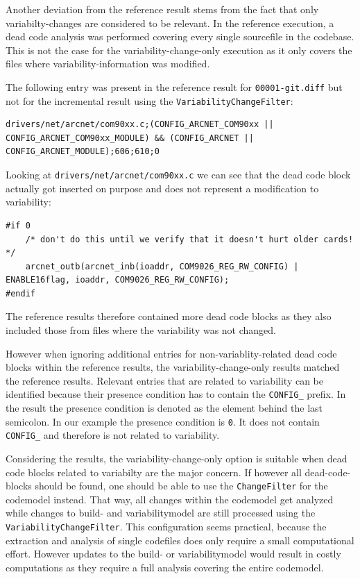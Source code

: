 \documentclass[a4paper]{article}
\begin{document}
Another deviation from the reference result stems from the fact that only variabilty-changes are considered to be relevant. In the reference execution, a dead code analysis was performed covering every single sourcefile in the codebase. This is not the case for the variability-change-only execution as it only covers the files where variability-information was modified.

The following entry was present in the reference result for \texttt{00001-git.diff} but not for the incremental result using the \texttt{VariabilityChangeFilter}:

\begin{lstlisting}
drivers/net/arcnet/com90xx.c;(CONFIG_ARCNET_COM90xx || CONFIG_ARCNET_COM90xx_MODULE) && (CONFIG_ARCNET || CONFIG_ARCNET_MODULE);606;610;0
\end{lstlisting}

Looking at \texttt{drivers/net/arcnet/com90xx.c} we can see that the dead code block actually got inserted on purpose and does not represent a modification to variability:

\begin{lstlisting}
#if 0
    /* don't do this until we verify that it doesn't hurt older cards! */
    arcnet_outb(arcnet_inb(ioaddr, COM9026_REG_RW_CONFIG) | ENABLE16flag, ioaddr, COM9026_REG_RW_CONFIG);
#endif
\end{lstlisting}

The reference results therefore contained more dead code blocks as they also included those from files where the variability was not changed. 

However when ignoring additional entries for non-variablity-related dead code blocks within the reference results, the variability-change-only results matched the reference results. Relevant entries that are related to variability can be identified because their presence condition has to contain the \texttt{CONFIG\_} prefix. In the result the presence condition is denoted as the element behind the last semicolon. In our example the presence condition is \texttt{0}. It does not contain \texttt{CONFIG\_} and therefore is not related to variability.

Considering the results, the variability-change-only option is suitable when dead code blocks related to variabilty are the major concern. If however all dead-code-blocks should be found, one should be able to use the \texttt{ChangeFilter} for the codemodel instead. That way, all changes within the codemodel get analyzed while changes to build- and variabilitymodel are still processed using the \texttt{VariabilityChangeFilter}. This configuration seems practical, because the extraction and analysis of single codefiles does only require a small computational effort. However updates to the build- or variabilitymodel would result in costly computations as they require a full analysis covering the entire codemodel.
\end{document}
